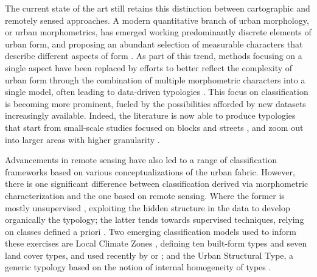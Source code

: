 The current state of the art still retains this distinction between cartographic
and remotely sensed approaches. A modern quantitative branch of urban
morphology, or urban morphometrics, has emerged working predominantly discrete
elements of urban form, and proposing an abundant selection of measurable
characters that describe different aspects of form
\citep{fleischmann2020measuring}. As part of this trend, methods focusing on a
single aspect \citep{porta2006} have been replaced by efforts to better reflect
the complexity of urban form through the combination of multiple morphometric
characters into a single model, often leading to data-driven typologies
\citep{song2007}. This focus on classification is becoming more prominent,
fueled by the possibilities afforded by new datasets increasingly available.
Indeed, the literature is now able to produce typologies that start from
small-scale studies focused on blocks and streets \citep{gil2012}, and zoom out
into larger areas with higher granularity \citep{schirmer2015, araldi2019,
bobkova2019, dibble2019origin, jochem2020}.

Advancements in remote sensing have also led to a range of classification
frameworks based on various conceptualizations of the urban fabric. However,
there is one significant difference between classification derived via
morphometric characterization and the one based on remote sensing. Where the
former is mostly unsupervised \citep{araldi2019, schirmer2015}, exploiting the
hidden structure in the data to develop organically the typology; the latter
tends towards supervised techniques, relying on classes defined a priori
\citep{ pauleit2000assessing}. Two emerging classification models used to inform
these exercises are Local Climate Zones \citep{stewart2012}, defining ten
built-form types and seven land cover types, and used recently by
\cite{koc2017mapping} or \cite{taubenbock2020}; and the Urban Structural Type, a
generic typology based on the notion of internal homogeneity of types
\citep{lehner2019}.



